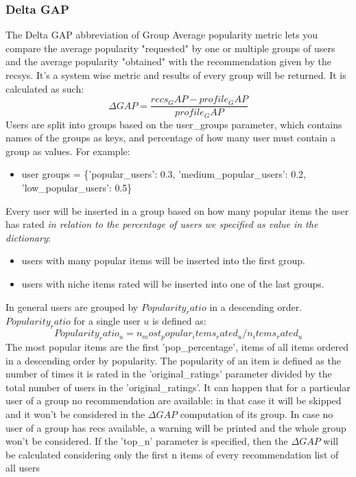 \documentclass[11pt]{article}
\begin{document}
\subsubsection{Delta GAP}\label{sec:DG}
The Delta GAP abbreviation of Group Average popularity metric lets you compare the average popularity "requested" by
one or multiple groups of users and the average popularity "obtained" with the recommendation given by the recsys.
It's a system wise metric and results of every group will be returned. It is calculated as such:
\hfill\break
\hfill\break
    \[
        \Delta GAP = \frac{recs_GAP - profile_GAP}{profile_GAP}
    \]
\hfill\break
\hfill\break
Users are split into groups based on the user_groups parameter, which contains names of the groups as keys,
and percentage of how many user must contain a group as values. For example:
\begin{itemize}
    \item user groups = \{'popular\_users': 0.3, 'medium\_popular\_users': 0.2, 'low\_popular\_users': 0.5\}
\end{itemize}
\hfill\break
\hfill\break
Every user will be inserted in a group based on how many popular items the user has rated
\textit{in relation to the percentage of users we specified as value in the dictionary}:
\begin{itemize}
    \item users with many popular items will be inserted into the first group.
    \item users with niche items rated will be inserted into one of the last groups.
\end{itemize}
\hfill\break
\hfill\break
In general users are grouped by $Popularity_ratio$ in a descending order. $Popularity_ratio$ for a single user $u$
is defined as:
\hfill\break
\hfill\break
    \[
        Popularity_ratio_u = n_most_popular_items_rated_u / n_items_rated_u
    \]
\hfill\break
\hfill\break
The most popular items are the first 'pop_percentage', items of all items ordered in a descending order by
popularity. The popularity of an item is defined as the number of times it is rated in the 'original_ratings' parameter
divided by the total number of users in the 'original_ratings'.
\hfill\break
\hfill\break
It can happen that for a particular user of a group no recommendation are available: in that case it will be skipped
and it won't be considered in the $\Delta GAP$ computation of its group. In case no user of a group has recs
available, a warning will be printed and the whole group won't be considered.
If the 'top_n' parameter is specified, then the $\Delta GAP$ will be calculated considering only the first
n items of every recommendation list of all users
\hfill\break
\hfill\break
\end{document}

